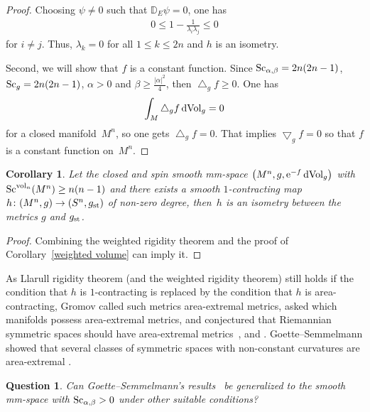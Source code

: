\documentclass[pdftex]{sigma}
\newtheorem{Question}[Theorem]{Question}
\newtheorem{Corollary}[Theorem]{Corollary}
\begin{document}
\begin{proof}
Choosing $\psi\neq 0$ such that ${\mathbb D}_E\psi=0$, one has
\begin{align*}
0\leq 1-\frac{1}{\lambda_i\lambda_j}\leq 0
\end{align*}
for $i\neq j$. Thus, $\lambda_k=0$ for all $1\leq k\leq 2n$ and $h$ is an isometry.

Second, we will show that $f$ is a constant function. Since ${\rm Sc}_{\alpha, \beta}=2n(2n-1)$, ${\rm Sc}_g=2n(2n-1)$, $\alpha> 0$ and $\beta \geq \frac{|\alpha|^2}{4}$,
then $\bigtriangleup_g f\geq 0$. One has
\begin{align*}
 \int_M \bigtriangleup_g f \,{\rm dVol}_g=0
\end{align*}
for a closed manifold~$M^n$, so one gets $\bigtriangleup_g f=0$. That implies $\bigtriangledown_gf=0$ so that $f$ is a constant function on~$M^n$.
\end{proof}

\begin{Corollary}Let the closed and spin smooth mm-space $\big(M^n,g, {\rm e}^{-f}\,{\rm dVol}_{g}\big)$ with ${\rm Sc}^{{\rm vol}_n}(M^n)\allowbreak \geq n(n-1)$ and there exists a smooth $1$-contracting map $h\colon (M^n, g)\to (S^n, g_{\rm st})$ of non-zero degree, then~$h$ is an isometry between the metrics $g$ and $g_{\rm st}$.
\end{Corollary}

\begin{proof}Combining the weighted rigidity theorem and the proof of Corollary~\ref{weighted volume} can imply it.
\end{proof}

As Llarull rigidity theorem (and the weighted rigidity theorem) still holds if the condition that $h$ is $1$-contracting is replaced by the condition that $h$ is area-contracting, Gromov called such metrics area-extremal metrics, asked which manifolds possess area-extremal metrics, and conjectured that Riemannian symmetric spaces should have area-extremal metrics~\cite{MR1389019}, \cite[Section~17]{Gromov} and \cite[Section~4.2]{2019arXiv190810612G}. Goette--Semmelmann showed that several classes of symmetric spaces with non-constant curvatures are area-extremal \cite{MR1877585}.

\begin{Question}Can Goette--Semmelmann's results~{\rm \cite{MR1877585}} be generalized to the smooth mm-space with ${\rm Sc}_{\alpha, \beta}>0$ under other suitable conditions?
\end{Question}
\end{document}
